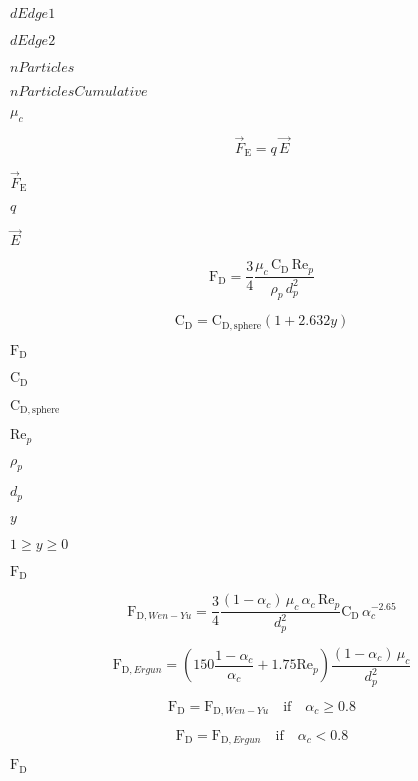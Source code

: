 \documentclass{article}
\begin{document}
$        dEdge1      $
\pagebreak

$        dEdge2      $
\pagebreak

$        nParticles  $
\pagebreak

$        nParticlesCumulative $
\pagebreak

$        \mu_c    $
\pagebreak

\[
    \vec{F}_\mathrm{E} = q \, \vec{E}
\]
\pagebreak

$        \vec{F}_\mathrm{E}  $
\pagebreak

$        q                   $
\pagebreak

$        \vec{E}             $
\pagebreak

\[
    \mathrm{F}_\mathrm{D} =
        \frac{3}{4}
        \frac{\mu_c\,\mathrm{C}_\mathrm{D}\,\mathrm{Re}_p}{\rho_p \, d_p^2}
\]
\pagebreak

\[
    \mathrm{C}_\mathrm{D} =
        \mathrm{C}_{\mathrm{D, sphere}} \left( 1 + 2.632 y \right)
\]
\pagebreak

$        \mathrm{F}_\mathrm{D}  $
\pagebreak

$        \mathrm{C}_\mathrm{D}  $
\pagebreak

$        \mathrm{C}_{\mathrm{D, sphere}} $
\pagebreak

$        \mathrm{Re}_p          $
\pagebreak

$        \rho_p                 $
\pagebreak

$        d_p                    $
\pagebreak

$        y    $
\pagebreak

$ 1 \geq y \geq 0 $
\pagebreak

$\mathrm{F}_\mathrm{D}$
\pagebreak

\[
    \mathrm{F}_{\mathrm{D}, Wen-Yu} =
        \frac{3}{4}
        \frac{(1 - \alpha_c) \, \mu_c \, \alpha_c \, \mathrm{Re}_p }{d_p^2}
        \mathrm{C}_\mathrm{D} \, \alpha_c^{-2.65}
\]
\pagebreak

\[
    \mathrm{F}_{\mathrm{D}, Ergun} =
        \left(150 \frac{1-\alpha_c}{\alpha_c} + 1.75 \mathrm{Re}_p \right)
        \frac{(1-\alpha_c) \, \mu_c}{d_p^2}
\]
\pagebreak

\[
    \mathrm{F}_\mathrm{D} = \mathrm{F}_{\mathrm{D}, Wen-Yu}
        \quad \mathrm{if} \quad \alpha_c \geq 0.8
\]
\pagebreak

\[
    \mathrm{F}_\mathrm{D} = \mathrm{F}_{\mathrm{D}, Ergun}
        \quad \mathrm{if} \quad \alpha_c < 0.8
\]
\pagebreak

$        \mathrm{F}_\mathrm{D} $
\pagebreak
\end{document}
